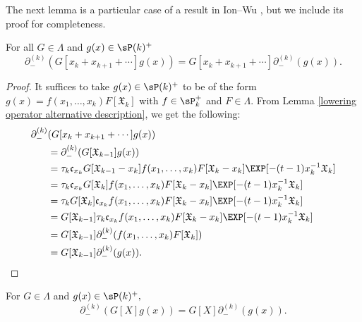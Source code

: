 The next lemma is a particular case of a result in Ion--Wu \cite[Section 7, (7.8), page 35]{Ion_2022}, but we include its proof for completeness.

\begin{lemm}\label{lowering is a partial sym module map}
For all $G \in \Lambda$ and $g(x) \in \sP(k)^{+}$ 
$$ \partial_{-}^{(k)}(G[x_k + x_{k+1}+ \cdots]g(x)) = G[x_k + x_{k+1}+ \cdots] \partial_{-}^{(k)}(g(x)).$$
\end{lemm}

\begin{proof}
It suffices to take $g(x) \in \sP(k)^{+}$ to be of the form $g(x) = f(x_1,\ldots,x_k)F[\mathfrak{X}_{k}]$ with $f\in \sP_{k}^{+}$ and $F \in \Lambda$.
From Lemma \ref{lowering operator alternative description}, we get the following:
\begin{align*}
\partial_{-}^{(k)}&(G[x_k + x_{k+1}+ \cdots]g(x)) \\ 
&= \partial_{-}^{(k)}(G[\mathfrak{X}_{k-1}]g(x)) \\
&= \tau_k \mathfrak{c}_{x_k} G[\mathfrak{X}_{k-1}-x_k] f(x_1,\ldots,x_k)F[\mathfrak{X}_{k} - x_k]\EXP[-(t-1)x_k^{-1}\mathfrak{X}_{k}] \\
&= \tau_k \mathfrak{c}_{x_k} G[\mathfrak{X}_{k}] f(x_1,\ldots,x_k)F[\mathfrak{X}_{k} - x_k]\EXP[-(t-1)x_k^{-1}\mathfrak{X}_{k}] \\
&= \tau_kG[\mathfrak{X}_{k}]\mathfrak{c}_{x_k}f(x_1,\ldots,x_k)F[\mathfrak{X}_{k} - x_k]\EXP[-(t-1)x_k^{-1}\mathfrak{X}_{k}]\\
&= G[\mathfrak{X}_{k-1}]\tau_k\mathfrak{c}_{x_k}f(x_1,\ldots,x_k)F[\mathfrak{X}_{k} - x_k]\EXP[-(t-1)x_k^{-1}\mathfrak{X}_{k}]\\
&= G[\mathfrak{X}_{k-1}]\partial_{-}^{(k)}(f(x_1,\ldots,x_k)F[\mathfrak{X}_{k}]) \\
&= G[\mathfrak{X}_{k-1}]\partial_{-}^{(k)}(g(x)). \qedhere
\end{align*}    
\end{proof}

\begin{coro}\label{lowering is a sym module map}
    For $G \in \Lambda$ and $g(x) \in \sP(k)^{+},$
    $$\partial_{-}^{(k)}(G[X]g(x)) = G[X] \partial_{-}^{(k)}(g(x)).$$
\end{coro}

